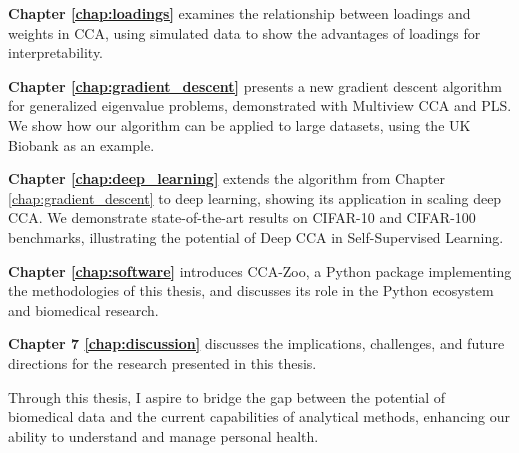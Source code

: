 \textbf{Chapter \ref{chap:loadings}} examines the relationship between loadings and weights in CCA, using simulated data to show the advantages of loadings for interpretability.

\textbf{Chapter \ref{chap:gradient_descent}} presents a new gradient descent algorithm for generalized eigenvalue problems, demonstrated with Multiview CCA and PLS. We show how our algorithm can be applied to large datasets, using the UK Biobank as an example.

\textbf{Chapter \ref{chap:deep_learning}} extends the algorithm from Chapter \ref{chap:gradient_descent} to deep learning, showing its application in scaling deep CCA. We demonstrate state-of-the-art results on CIFAR-10 and CIFAR-100 benchmarks, illustrating the potential of Deep CCA in Self-Supervised Learning.

\textbf{Chapter \ref{chap:software}} introduces CCA-Zoo, a Python package implementing the methodologies of this thesis, and discusses its role in the Python ecosystem and biomedical research.

\textbf{Chapter 7 \ref{chap:discussion}} discusses the implications, challenges, and future directions for the research presented in this thesis.

Through this thesis, I aspire to bridge the gap between the potential of biomedical data and the current capabilities of analytical methods, enhancing our ability to understand and manage personal health.
